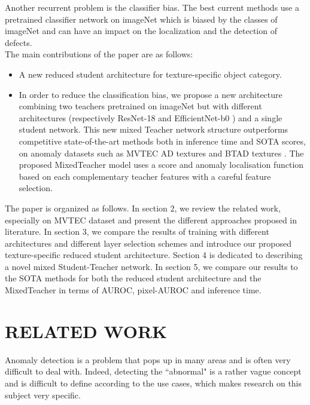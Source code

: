 \documentclass[a4paper,twoside]{article}
\begin{document}
\noindent Another recurrent problem is the classifier bias. The best current methods use a pretrained classifier network on imageNet which is biased by the classes of imageNet and can have an impact on the localization and the detection of defects. \\

\noindent The main contributions of the paper are as follows: 
\begin{itemize}
\item A new reduced student architecture for texture-specific object category.


\item In order to reduce the classification bias, we propose a new architecture combining two teachers pretrained on imageNet but with different architectures (respectively ResNet-18 \citep{he_deep_2015} and EfficientNet-b0 \citep{tan_efficientnet_2020}) and a single student network. This new mixed Teacher network structure outperforms competitive state-of-the-art methods both in inference time and SOTA scores, on anomaly datasets such as MVTEC AD textures and BTAD textures \citep{mishra_vt-adl_2021}. The proposed MixedTeacher model uses a score and anomaly localisation function based on each complementary teacher features with a careful feature selection.

\end{itemize}



The paper is organized as follows. In section 2, we review the related work, especially on MVTEC dataset and present the different approaches proposed in literature. In section 3, we compare the results of training with different architectures and different layer selection schemes and introduce our proposed texture-specific reduced student architecture. Section 4 is dedicated to describing a novel mixed Student-Teacher network. In section 5, we compare our results to the SOTA methods for both the reduced student architecture and the MixedTeacher in terms of AUROC, pixel-AUROC and inference time.

\section{\uppercase{RELATED WORK}}

 Anomaly detection is a problem that pops up in many areas and is often very difficult to deal with. Indeed, detecting the ``abnormal" is a rather vague concept and is difficult to define according to the use cases, which makes research on this subject very specific.
 
\end{document}

